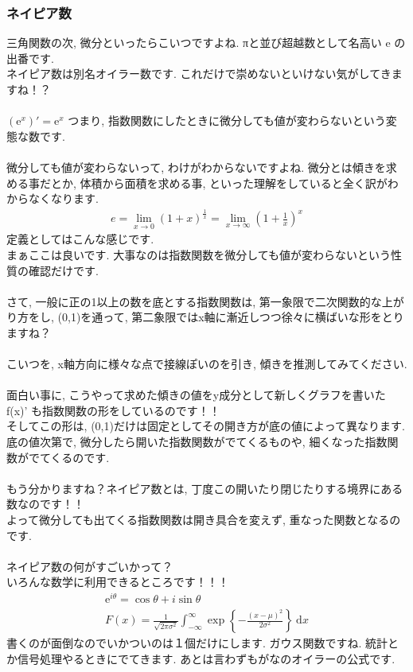 \documentclass[11pt,a4paper]{jsarticle}
\begin{document}
\subsubsection{ネイピア数}
三角関数の次, 微分といったらこいつですよね. πと並び超越数として名高い e の出番です.\\
ネイピア数は別名オイラー数です. これだけで崇めないといけない気がしてきますね！？\\
\\
$(\mathrm{e}^x)' = \mathrm{e}^x$ つまり, 指数関数にしたときに微分しても値が変わらないという変態な数です.\\
\\
微分しても値が変わらないって, わけがわからないですよね. 微分とは傾きを求める事だとか, 体積から面積を求める事, といった理解をしていると全く訳がわからなくなります.\\
\begin{eqnarray}
e = \lim_{x\to 0} (1+x)^\frac{1}{x} = \lim_{x \to \infty} (1+\frac{1}{x})^x
\end{eqnarray}
定義としてはこんな感じです.\\
まぁここは良いです. 大事なのは指数関数を微分しても値が変わらないという性質の確認だけです.\\
\\
さて, 一般に正の1以上の数を底とする指数関数は, 第一象限で二次関数的な上がり方をし, (0,1)を通って, 第二象限ではx軸に漸近しつつ徐々に横ばいな形をとりますね？\\
\\
こいつを, x軸方向に様々な点で接線ぽいのを引き, 傾きを推測してみてください. \\
\\
面白い事に, こうやって求めた傾きの値をy成分として新しくグラフを書いた f(x)' も指数関数の形をしているのです！！\\
そしてこの形は, (0,1)だけは固定としてその開き方が底の値によって異なります. \\
底の値次第で, 微分したら開いた指数関数がでてくるものや, 細くなった指数関数がでてくるのです.\\
\\
もう分かりますね？ネイピア数とは, 丁度この開いたり閉じたりする境界にある数なのです！！\\
よって微分しても出てくる指数関数は開き具合を変えず, 重なった関数となるのです.\\
\\
ネイピア数の何がすごいかって？\\
いろんな数学に利用できるところです！！！\\
\begin{eqnarray}
\mathrm{e}^{i\theta} = \cos\theta + i\sin\theta \\
F(x)=\frac{1}{\sqrt{2\pi \sigma^2}}\int_{-\infty}^{\infty}\exp{\left\{-\frac{(x-\mu)^2}{2\sigma^2}\right\}}\ \mathrm{d}x
\end{eqnarray}
書くのが面倒なのでいかついのは１個だけにします. ガウス関数ですね. 統計とか信号処理やるときにでてきます. あとは言わずもがなのオイラーの公式です.\\
\end{document}
